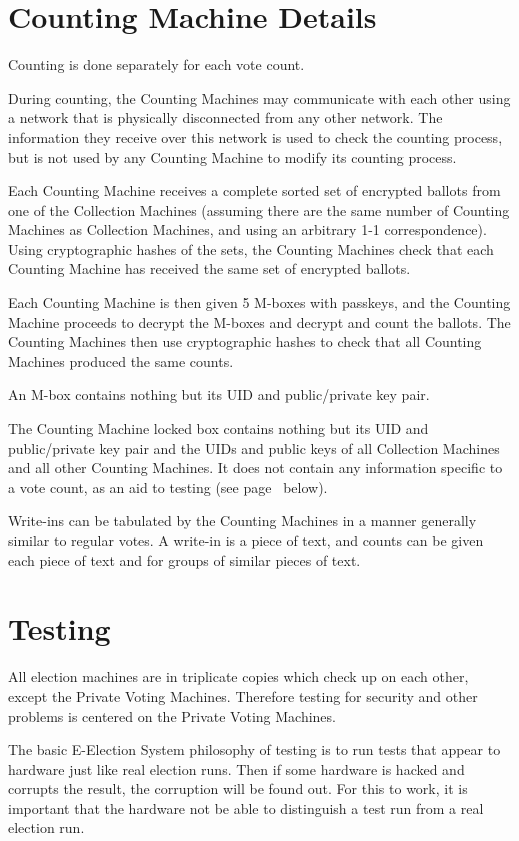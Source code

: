 \documentclass[12pt]{article}
\newcommand{\pagref}[1]{(see page~\pageref{#1} below)}
\begin{document}
\section{Counting Machine Details}

Counting is done separately for each vote count.

During counting, the Counting Machines may communicate with
each other using a network that is physically disconnected
from any other network.  The information they receive over this
network is used to check the counting process, but is not used
by any Counting Machine to modify its counting process.

Each Counting Machine receives a complete sorted set of encrypted ballots
from one of the Collection Machines (assuming there are the same
number of Counting Machines as Collection Machines, and using an
arbitrary 1-1 correspondence).
Using cryptographic hashes of the sets, the Counting
Machines check that each Counting Machine has received the same set
of encrypted ballots.

Each Counting Machine is then given 5 M-boxes with passkeys,
and the Counting Machine proceeds to decrypt the M-boxes and
decrypt and count the ballots.  The Counting Machines then use
cryptographic hashes to check
that all Counting Machines produced the same counts.

An M-box contains nothing but its UID and public/private key pair.

The Counting Machine locked box contains nothing but its
UID and public/private key pair and the UIDs
and public keys of all Collection Machines and all other Counting Machines.
It does not contain any information specific to a vote count,
as an aid to testing \pagref{TESTING}.

Write-ins can be tabulated by the Counting Machines in a manner
generally similar to regular votes.  A write-in is a piece of
text, and counts can be given each piece of text and for groups
of similar pieces of text.

\section{Testing}\label{TESTING}

All election machines are in triplicate copies which check up on each
other, except the Private Voting Machines.  Therefore testing
for security and other problems is centered on the Private Voting
Machines.

The basic E-Election System philosophy of testing is to run tests
that appear to hardware just like real election runs.  Then if
some hardware is hacked and corrupts the result, the corruption
will be found out.  For this to work, it is important that the
hardware not be able to distinguish a test run from a real election run.
\end{document}
